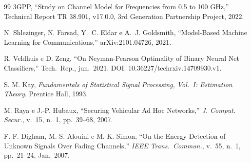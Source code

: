 \documentclass[12pt,a4paper]{article}
\begin{document}
\begin{thebibliography}{99}
 3GPP, ``Study on Channel Model for Frequencies from 0.5 to 100 GHz,'' Technical Report TR 38.901, v17.0.0, 3rd Generation Partnership Project, 2022.

 N. Shlezinger, N. Farsad, Y.~C. Eldar e A.~J. Goldsmith, ``Model-Based Machine Learning for Communications,'' arXiv:2101.04726, 2021.

 R. Veldhuis e D. Zeng, ``On Neyman-Pearson Optimality of Binary Neural Net Classifiers,'' Tech.\ Rep., jun.\ 2021. DOI: 10.36227/techrxiv.14709930.v1.

 S. M. Kay, \textit{Fundamentals of Statistical Signal Processing, Vol.~I: Estimation Theory}. Prentice Hall, 1993.

 M. Raya e J.-P. Hubaux, ``Securing Vehicular Ad Hoc Networks,'' \textit{J. Comput. Secur.}, v.~15, n.~1, pp.~39--68, 2007.

 F. F. Digham, M.-S. Alouini e M. K. Simon, ``On the Energy Detection of Unknown Signals Over Fading Channels,'' \textit{IEEE Trans.\ Commun.}, v.~55, n.~1, pp.~21--24, Jan.\ 2007.

\end{thebibliography}
\end{document}
